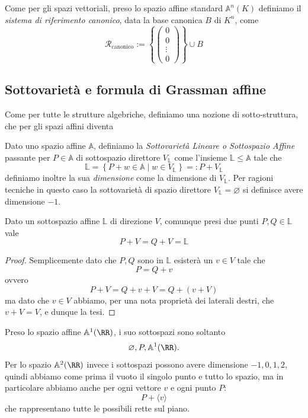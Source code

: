 \documentclass[11pt]{scrartcl}
\newcommand{\eset}{\varnothing}
\renewcommand{\AA}{\mathbb{A}}
\begin{document}
   	 \begin{definition}
   	 	Come per gli spazi vettoriali, preso lo spazio affine standard $\mathbb{A}^n\!\left(K\right)$  definiamo il \textit{sistema di riferimento canonico}, data la base canonica $B$ di $K^n$, come
   	 	$$\mathcal{R}_\text{canonico}:=\left\{\begin{pmatrix}
   	 		0 \\
   	 		0 \\
   	 		\vdots \\
   	 		0
   	 	\end{pmatrix}\right\}\cup B$$
   	 \end{definition}
   	 \subsection{Sottovarietà e formula di Grassman affine}
   	 Come per tutte le strutture algebriche, definiamo una nozione di sotto-struttura, che per gli spazi affini diventa
   	 \begin{definition}
   	 	Dato uno spazio affine $\mathbb{A}$, definiamo la \textit{Sottovarietà Lineare o Sottospazio Affine} passante per $P\in \mathbb{A}$ di sottospazio direttore $V_\mathbb{L}$ come l'insieme $\mathbb{L}\le \mathbb{A}$ tale che
   	 	$$\mathbb{L}=\left\{P+w\in\mathbb{A}\mid w\in V_\mathbb{L}\right\}=:P+V_{\mathbb{L}}$$ 
   	 	definiamo inoltre la sua \textit{dimensione} come la dimensione di $V_\mathbb{L}$. Per ragioni tecniche in questo caso la sottovarietà di spazio direttore $V_\mathbb{L}=\eset$ si definisce avere dimensione $-1$.
   	 \end{definition}
   	 \begin{proposition}
   	 	Dato un sottospazio affine $\mathbb{L}$ di direzione $V$, comunque presi due punti $P,Q\in\mathbb{L}$ vale
   	 	$$P+V=Q+V=\mathbb{L}$$ 
   	 \end{proposition}
   	 \begin{proof}
   	 	Semplicemente dato che $P,Q$ sono in $\mathbb{L}$ esisterà un $v\in V$ tale che 
   	 	$$P=Q+v$$
   	 	ovvero
   	 	$$P+V=Q+v+V=Q+(v+V)$$
   	 	ma dato che $v\in V$ abbiamo, per una nota proprietà dei laterali destri, che $v+V=V$, e dunque la tesi.
   	 \end{proof}
   	 \begin{example}
   	 	Preso lo spazio affine $\AA^1(\RR)$, i suo sottospazi sono soltanto
   	 	$$\eset, P, \AA^1(\RR).$$
   	 	Per lo spazio $\AA^2(\RR)$ invece i sottospazi possono avere dimensione $-1,0,1,2$, quindi abbiamo come prima il vuoto il singolo punto e tutto lo spazio, ma in particolare abbiamo anche per ogni vettore $v$ e ogni punto $P$:
   	 	$$P+\langle v \rangle$$
   	 	che rappresentano tutte le possibili rette sul piano.
   	 \end{example}
\end{document}
